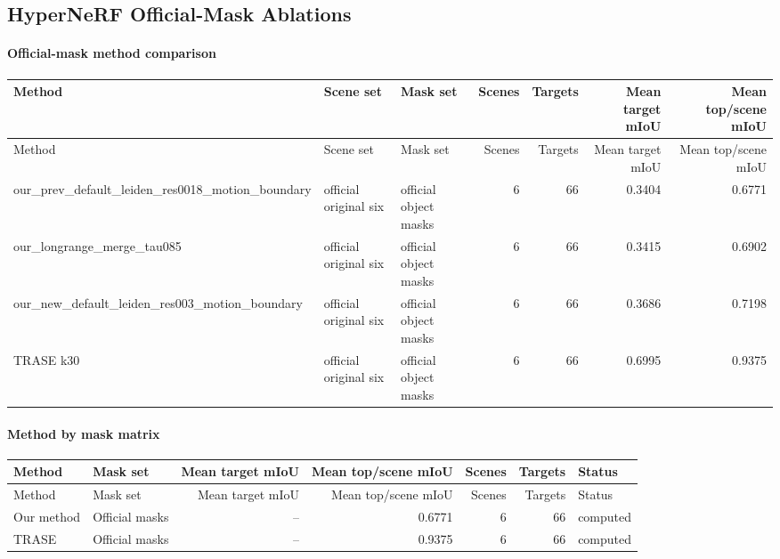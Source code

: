 \documentclass[10pt]{article}
\begin{document}
\subsection{HyperNeRF Official-Mask Ablations}
\paragraph{Official-mask method comparison}
\small
\begin{longtable}{lllrrrr}
\toprule
Method & Scene set & Mask set & Scenes & Targets & Mean target mIoU & Mean top/scene mIoU \\
\midrule
\endfirsthead
\toprule
Method & Scene set & Mask set & Scenes & Targets & Mean target mIoU & Mean top/scene mIoU \\
\midrule
\endhead
our\_prev\_default\_leiden\_res0018\_motion\_boundary & official original six & official object masks & 6 & 66 & 0.3404 & 0.6771 \\
our\_longrange\_merge\_tau085 & official original six & official object masks & 6 & 66 & 0.3415 & 0.6902 \\
our\_new\_default\_leiden\_res003\_motion\_boundary & official original six & official object masks & 6 & 66 & 0.3686 & 0.7198 \\
TRASE k30 & official original six & official object masks & 6 & 66 & 0.6995 & 0.9375 \\
\bottomrule
\end{longtable}
\normalsize

\paragraph{Method by mask matrix}
\small
\begin{longtable}{llrrrrl}
\toprule
Method & Mask set & Mean target mIoU & Mean top/scene mIoU & Scenes & Targets & Status \\
\midrule
\endfirsthead
\toprule
Method & Mask set & Mean target mIoU & Mean top/scene mIoU & Scenes & Targets & Status \\
\midrule
\endhead
Our method & Official masks & -- & 0.6771 & 6 & 66 & computed \\
TRASE & Official masks & -- & 0.9375 & 6 & 66 & computed \\
\bottomrule
\end{longtable}
\normalsize
\end{document}
